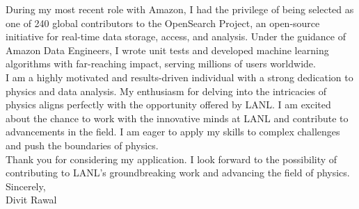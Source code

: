 \documentclass[letterpaper,11pt]{article}
\begin{document}
\vspace{5mm}
During my most recent role with Amazon, I had the privilege of being selected as one of 240 global contributors to the OpenSearch Project, an open-source initiative for real-time data storage, access, and analysis. Under the guidance of Amazon Data Engineers, I wrote unit tests and developed machine learning algorithms with far-reaching impact, serving millions of users worldwide.\\
\vspace{5mm}
I am a highly motivated and results-driven individual with a strong dedication to physics and data analysis. My enthusiasm for delving into the intricacies of physics aligns perfectly with the opportunity offered by LANL. I am excited about the chance to work with the innovative minds at LANL and contribute to advancements in the field. I am eager to apply my skills to complex challenges and push the boundaries of physics.\\
\vspace{5mm}
Thank you for considering my application. I look forward to the possibility of contributing to LANL's groundbreaking work and advancing the field of physics.\\
\vspace{5mm}
Sincerely,\\
Divit Rawal
\end{document}
